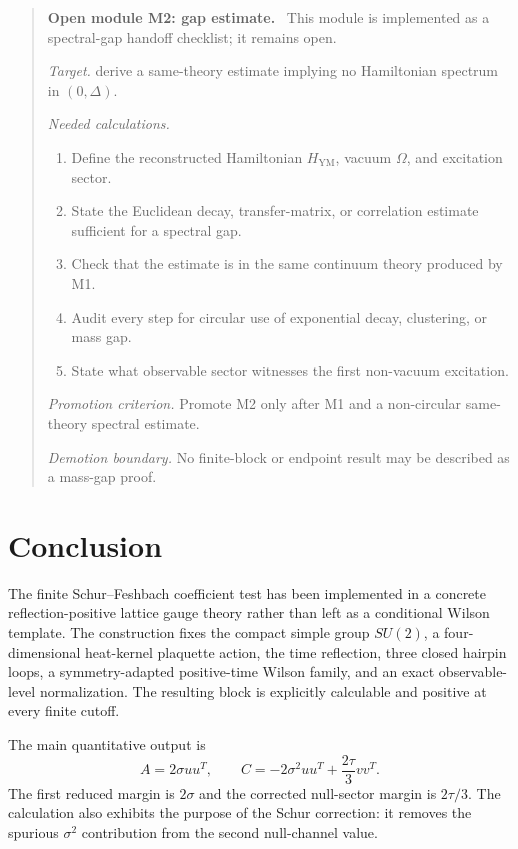 \documentclass[11pt]{article}
\newenvironment{openmodule}[1]
{\begin{quote}\color{red!55!black}\textbf{Open module #1.}\ }
{\end{quote}}
\begin{document}
\begin{openmodule}{M2: gap estimate}
This module is implemented as a spectral-gap handoff checklist; it remains open.

\emph{Target.} derive a same-theory estimate implying no Hamiltonian spectrum in \((0,\Delta)\).

\emph{Needed calculations.}
\begin{enumerate}[label=(\alph*)]
  \item Define the reconstructed Hamiltonian \(H_{\mathrm{YM}}\), vacuum \(\Omega\), and excitation sector.
  \item State the Euclidean decay, transfer-matrix, or correlation estimate sufficient for a spectral gap.
  \item Check that the estimate is in the same continuum theory produced by M1.
  \item Audit every step for circular use of exponential decay, clustering, or mass gap.
  \item State what observable sector witnesses the first non-vacuum excitation.
\end{enumerate}

\emph{Promotion criterion.} Promote M2 only after M1 and a non-circular same-theory spectral estimate.

\emph{Demotion boundary.} No finite-block or endpoint result may be described as a mass-gap proof.
\end{openmodule}

\section{Conclusion}

The finite Schur--Feshbach coefficient test has been implemented in a concrete reflection-positive lattice gauge theory rather than left as a conditional Wilson template.  The construction fixes the compact simple group $SU(2)$, a four-dimensional heat-kernel plaquette action, the time reflection, three closed hairpin loops, a symmetry-adapted positive-time Wilson family, and an exact observable-level normalization.  The resulting block is explicitly calculable and positive at every finite cutoff.

The main quantitative output is
\[
  A=2\sigma uu^T,
  \qquad
  C=-2\sigma^2uu^T+\frac{2\tau}{3}vv^T.
\]
The first reduced margin is $2\sigma$ and the corrected null-sector margin is $2\tau/3$.  The calculation also exhibits the purpose of the Schur correction: it removes the spurious $\sigma^2$ contribution from the second null-channel value.
\end{document}

